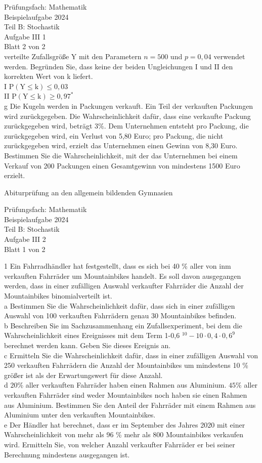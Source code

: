 \documentclass[10pt]{article}
\begin{document}
Prüfungsfach: Mathematik\\
Beispielaufgabe 2024\\
Teil B: Stochastik\\
Aufgabe III 1\\
Blatt 2 von 2\\
verteilte Zufallsgröße Y mit den Parametern $n=500$ und $p=0,04$ verwendet werden. Begründen Sie, dass keine der beiden Ungleichungen I und II den korrekten Wert von k liefert.\\
I $\mathrm{P}(\mathrm{Y} \leq \mathrm{k}) \leq 0,03$\\
II $\mathrm{P}(\mathrm{Y} \leq \mathrm{k}) \geq 0,97^{*}$\\
g Die Kugeln werden in Packungen verkauft. Ein Teil der verkauften Packungen wird zurückgegeben. Die Wahrscheinlichkeit dafür, dass eine verkaufte Packung zurückgegeben wird, beträgt $3 \%$. Dem Unternehmen entsteht pro Packung, die zurückgegeben wird, ein Verlust von 5,80 Euro; pro Packung, die nicht zurückgegeben wird, erzielt das Unternehmen einen Gewinn von 8,30 Euro. Bestimmen Sie die Wahrscheinlichkeit, mit der das Unternehmen bei einem Verkauf von 200 Packungen einen Gesamtgewinn von mindestens 1500 Euro erzielt.

Abiturprüfung an den allgemein bildenden Gymnasien

Prüfungsfach: Mathematik\\
Beispielaufgabe 2024\\
Teil B: Stochastik\\
Aufgabe III 2\\
Blatt 1 von 2

1 Ein Fahrradhändler hat festgestellt, dass es sich bei 40 \% aller von inm verkauften Fahrräder um Mountainbikes handelt. Es soll davon ausgegangen werden, dass in einer zufälligen Auswahl verkaufter Fahrräder die Anzahl der Mountainbikes binomialverteilt ist.\\
a Bestimmen Sie die Wahrscheinlichkeit dafür, dass sich in einer zufälligen Auswahl von 100 verkauften Fahrrädern genau 30 Mountainbikes befinden.\\
b Beschreiben Sie im Sachzusammenhang ein Zufallsexperiment, bei dem die Wahrscheinlichkeit eines Ereignisses mit dem Term 1-0,6 ${ }^{10}-10 \cdot 0,4 \cdot 0,6^{9}$ berechnet werden kann. Geben Sie dieses Ereignis an.\\
c Ermitteln Sie die Wahrscheinlichkeit dafür, dass in einer zufälligen Auswahl von 250 verkauften Fahrrädern die Anzahl der Mountainbikes um mindestens 10 \% größer ist als der Erwartungswert für diese Anzahl.\\
d $20 \%$ aller verkauften Fahrräder haben einen Rahmen aus Aluminium. $45 \%$ aller verkauften Fahrräder sind weder Mountainbikes noch haben sie einen Rahmen aus Aluminium. Bestimmen Sie den Anteil der Fahrräder mit einem Rahmen aus Aluminium unter den verkauften Mountainbikes.\\
e Der Händler hat berechnet, dass er im September des Jahres 2020 mit einer Wahrscheinlichkeit von mehr als 96 \% mehr als 800 Mountainbikes verkaufen wird. Ermitteln Sie, von welcher Anzahl verkaufter Fahrräder er bei seiner Berechnung mindestens ausgegangen ist.
\end{document}
